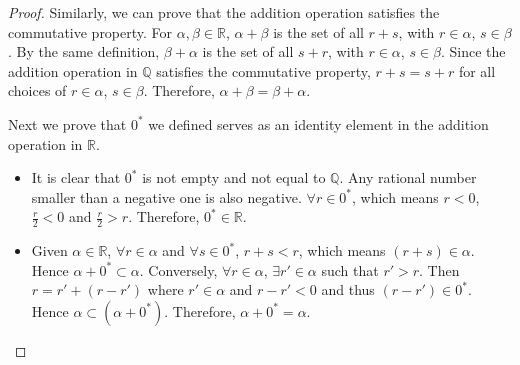 \documentclass{article}
\begin{document}
\begin{proof}
  Similarly, we can prove that the addition operation satisfies the commutative 
  property. For $\alpha, \beta \in \mathbb{R}$, $\alpha + \beta$ is the set of 
  all $r + s$, with $r \in \alpha$, $s \in \beta$. By the same definition, 
  $\beta + \alpha$ is the set of all $s + r$, with $r \in \alpha$, $s \in \beta$. 
  Since the addition operation in $\mathbb{Q}$ satisfies the commutative 
  property, $r + s = s + r$ for all choices of $r \in \alpha$, $s \in \beta$. 
  Therefore, $\alpha + \beta = \beta + \alpha$.

  Next we prove that $0^*$ we defined serves as an identity element in the 
  addition operation in $\mathbb{R}$.
  \begin{itemize}
    \item It is clear that $0^*$ is not empty and not equal to $\mathbb{Q}$. Any 
    rational number smaller than a negative one is also negative. 
    $\forall r \in 0^*$, which means $r < 0$, $\frac{r}{2} < 0$ and 
    $\frac{r}{2} > r$. Therefore, $0^* \in \mathbb{R}$.
    \item Given $\alpha \in \mathbb{R}$, $\forall r \in \alpha$ and 
    $\forall s \in 0^*$, $r + s < r$, which means $(r + s) \in \alpha$. Hence 
    $\alpha + 0^* \subset \alpha$. Conversely, $\forall r \in \alpha$, 
    $\exists r' \in \alpha$ such that $r' > r$. Then $r = r' + (r - r')$ where 
    $r' \in \alpha$ and $r - r' < 0$ and thus $(r - r') \in 0^*$. Hence 
    $\alpha \subset (\alpha + 0^*)$. Therefore, $\alpha + 0^* = \alpha$.
  \end{itemize}


\end{proof}
\end{document}
